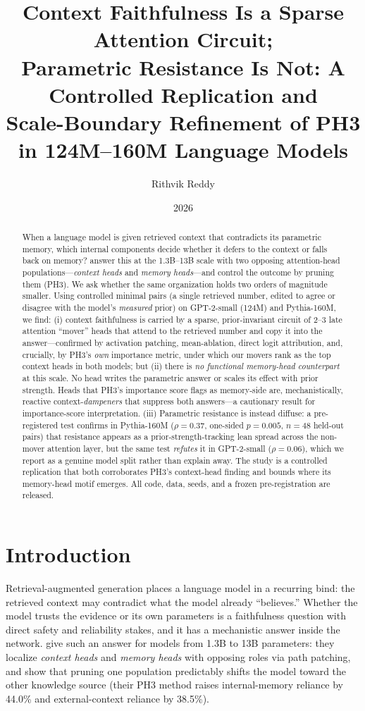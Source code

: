 \documentclass[11pt]{article}
\title{\textbf{Context Faithfulness Is a Sparse Attention Circuit;\\
Parametric Resistance Is Not: A Controlled Replication and\\
Scale-Boundary Refinement of PH3 in 124M--160M Language Models}}
\author{Rithvik Reddy}
\date{2026}
\begin{document}
\maketitle

\begin{abstract}
When a language model is given retrieved context that contradicts its
parametric memory, which internal components decide whether it defers to the
context or falls back on memory? \citet{jin2024ph3} answer this at the
1.3B--13B scale with two opposing attention-head populations---\emph{context
heads} and \emph{memory heads}---and control the outcome by pruning them
(PH3). We ask whether the same organization holds two orders of magnitude
smaller. Using controlled minimal pairs (a single retrieved number, edited to
agree or disagree with the model's \emph{measured} prior) on GPT-2-small
(124M) and Pythia-160M, we find: (i) context faithfulness is carried by a
sparse, prior-invariant circuit of 2--3 late attention ``mover'' heads that
attend to the retrieved number and copy it into the answer---confirmed by
activation patching, mean-ablation, direct logit attribution, and, crucially,
by PH3's \emph{own} importance metric, under which our movers rank as the top
context heads in both models; but (ii) there is \emph{no functional memory-head
counterpart} at this scale. No head writes the parametric answer or scales its
effect with prior strength. Heads that PH3's importance score flags as
memory-side are, mechanistically, reactive context-\emph{dampeners} that
suppress both answers---a cautionary result for importance-score
interpretation. (iii) Parametric resistance is instead diffuse: a
pre-registered test confirms in Pythia-160M ($\rho=0.37$, one-sided
$p=0.005$, $n=48$ held-out pairs) that resistance appears as a
prior-strength-tracking lean spread across the non-mover attention layer, but
the same test \emph{refutes} it in GPT-2-small ($\rho=0.06$), which we report
as a genuine model split rather than explain away. The study is a controlled
replication that both corroborates PH3's context-head finding and bounds where
its memory-head motif emerges. All code, data, seeds, and a frozen
pre-registration are released.
\end{abstract}

\section{Introduction}

Retrieval-augmented generation places a language model in a recurring bind:
the retrieved context may contradict what the model already ``believes.''
Whether the model trusts the evidence or its own parameters is a faithfulness
question with direct safety and reliability stakes, and it has a mechanistic
answer inside the network. \citet{jin2024ph3} give such an answer for models
from 1.3B to 13B parameters: they localize \emph{context heads} and
\emph{memory heads} with opposing roles via path patching, and show that
pruning one population predictably shifts the model toward the other
knowledge source (their PH3 method raises internal-memory reliance by 44.0\%
and external-context reliance by 38.5\%).
\end{document}
